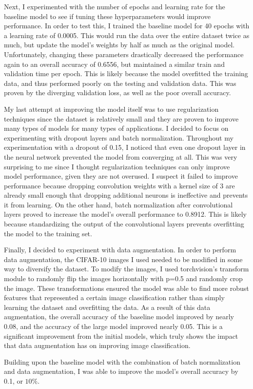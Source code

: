 \documentclass[11pt,a4paper]{article}
\begin{document}
Next, I experimented with the number of epochs and learning rate for the baseline model to see if tuning these hyperparameters 
 would improve performance. In order to test this, I trained the baseline model for 40 epochs with a learning rate of 0.0005.
  This would run the data over the entire dataset twice as much, but update the model's weights by half as much as the original 
  model. Unfortunately, changing these parameters drastically decreased the performance again to an overall accuracy of 0.6556, 
  but maintained a similar train and validation time per epoch. This is likely because the model overfitted the training data, 
  and thus performed poorly on the testing and validation data. This was proven by the diverging validation loss, as well as the 
  poor overall accuracy.

My last attempt at improving the model itself was to use regularization techniques since the dataset is relatively small and
 they are proven to improve many types of models for many types of applications. I decided to focus on experimenting with dropout 
 layers and batch normalization. Throughout my experimentation with a dropout of 0.15, I noticed that even one dropout layer in 
 the neural network prevented the model from converging \italics at all. This was very surprising to me since I thought regularization 
 techniques can only improve model performance, given they are not overused. I suspect it failed to improve performance because dropping 
 convolution weights with a kernel size of 3 are already small enough that dropping additional neurons is ineffective and prevents it
  from learning. On the other hand, batch normalization after convolutional layers proved to increase the model's overall performance
  to 0.8912. This is likely because standardizing the output of the convolutional layers prevents overfitting the model to the training set.

Finally, I decided to experiment with data augmentation. In order to perform data augmentation, the CIFAR-10 images I used needed
 to be modified in some way to diversify the dataset. To modify the images, I used torchvision's transform module to randomly flip 
 the images horizontally with p=0.5 and randomly crop the image. These transformations ensured the model was able to find more robust 
 features that represented a certain image classification rather than simply learning the dataset and overfitting the data. As a 
 result of this data augmentation, the overall accuracy of the baseline model improved by nearly 0.08, and the accuracy of the large 
 model improved nearly 0.05. This is a significant improvement from the initial models, which truly shows the impact that data 
 augmentation has on improving image classification.

Building upon the baseline model with the combination of batch normalization and data augmentation, I was able to improve the
 model's overall accuracy by 0.1, or $10\%$.


\printbibliography
\end{document}

